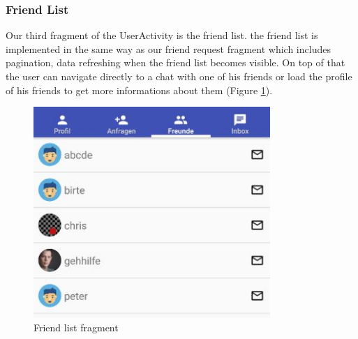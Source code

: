 \subsubsection{Friend List}
Our third fragment of the UserActivity is the friend list. the friend list is implemented in the same way as our friend request fragment which includes pagination, data refreshing when the friend list becomes visible. On top of that the user can navigate directly to a chat with one of his friends or load the profile of his friends to get more informations about them (Figure \ref{fig:friend_list}). 
\begin{figure}[htbp]
	\includegraphics[width=0.8\textwidth]{images/friend_list.jpg}
	\centering
	\caption{Friend list fragment}\label{fig:friend_list}
\end{figure} 

